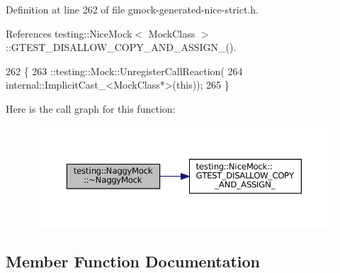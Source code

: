 Definition at line 262 of file gmock-\/generated-\/nice-\/strict.\+h.



References testing\+::\+Nice\+Mock$<$ Mock\+Class $>$\+::\+G\+T\+E\+S\+T\+\_\+\+D\+I\+S\+A\+L\+L\+O\+W\+\_\+\+C\+O\+P\+Y\+\_\+\+A\+N\+D\+\_\+\+A\+S\+S\+I\+G\+N\+\_\+().


\begin{DoxyCode}
262                        \{
263     ::testing::Mock::UnregisterCallReaction(
264         internal::ImplicitCast\_<MockClass*>(\textcolor{keyword}{this}));
265   \}
\end{DoxyCode}
Here is the call graph for this function\+:
\nopagebreak
\begin{figure}[H]
\begin{center}
\leavevmode
\includegraphics[width=350pt]{classtesting_1_1NaggyMock_a4d314aa583c985502eaec875440394ca_cgraph}
\end{center}
\end{figure}


\subsection{Member Function Documentation}
\mbox{\label{classtesting_1_1NaggyMock_af3b39b4a100fa43787c647fd9dbf30a8}} 
